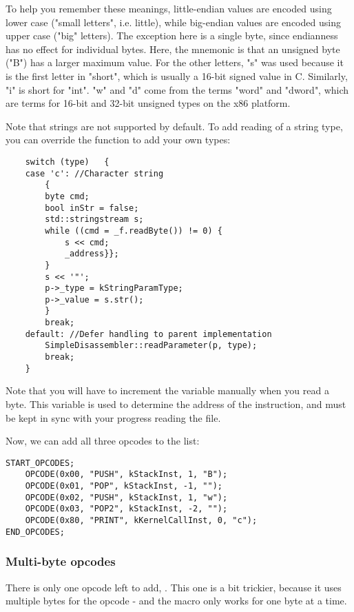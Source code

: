 To help you remember these meanings, little-endian values are encoded using lower case ("small letters", i.e. little), while big-endian values are encoded using upper case ("big" letters). The exception here is a single byte, since endianness has no effect for individual bytes. Here, the mnemonic is that an unsigned byte ("B") has a larger maximum value. For the other letters, "s" was used because it is the first letter in "short", which is usually a 16-bit signed value in C. Similarly, "i" is short for "int". "w" and "d" come from the terms "word" and "dword", which are terms for 16-bit and 32-bit unsigned types on the x86 platform.

Note that strings are not supported by default. To add reading of a string type, you can override the  function to add your own types:

\begin{C++}
\begin{lstlisting}
	switch (type)	{
	case 'c': //Character string
		{
		byte cmd;
		bool inStr = false;
		std::stringstream s;
		while ((cmd = _f.readByte()) != 0) {
			s << cmd;
			_address}};
		}
		s << '"';
		p->_type = kStringParamType;
		p->_value = s.str();
		}
		break;
	default: //Defer handling to parent implementation
		SimpleDisassembler::readParameter(p, type);
		break;
	}
\end{lstlisting}
\end{C++}

Note that you will have to increment the  variable manually when you read a byte. This variable is used to determine the address of the instruction, and must be kept in sync with your progress reading the file.

Now, we can add all three opcodes to the list:

\begin{C++}
\begin{lstlisting}
START_OPCODES;
	OPCODE(0x00, "PUSH", kStackInst, 1, "B");
	OPCODE(0x01, "POP", kStackInst, -1, "");
	OPCODE(0x02, "PUSH", kStackInst, 1, "w");
	OPCODE(0x03, "POP2", kStackInst, -2, "");
	OPCODE(0x80, "PRINT", kKernelCallInst, 0, "c");
END_OPCODES;
\end{lstlisting}
\end{C++}

\subsubsection{Multi-byte opcodes}
There is only one opcode left to add, . This one is a bit trickier, because it uses multiple bytes for the opcode - and the  macro only works for one byte at a time.

